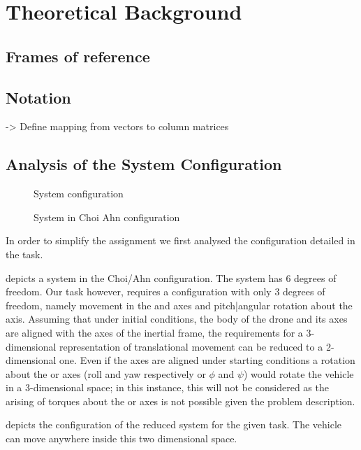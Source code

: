 \section{Theoretical Background}



\subsection{Frames of reference}

\subsection{Notation} %
-> Define mapping from vectors to column matrices

\subsection{Analysis of the System Configuration}\label{s:analysis}
\begin{figure*}[tb]
	\centering
	
	\caption{System configuration}
	\label{fig:sysconfig}
\end{figure*}
\begin{figure*}[tb]
	\centering
	
	\caption{System in Choi Ahn configuration}
	\label{fig:choiahnconfig}
\end{figure*}
In order to simplify the assignment we first analysed the configuration detailed in the task.

 depicts a system in the Choi/Ahn configuration. The system has 6 degrees of freedom. Our task however, requires a configuration with only 3 degrees of freedom, namely movement in the  and  axes and pitch|angular rotation about the  axis.
Assuming that under initial conditions, the body of the drone and its axes are aligned with the axes of the inertial frame, the requirements for a 3-dimensional representation of translational movement can be reduced to a 2-dimensional one. Even if the axes are aligned under starting conditions a rotation about the  or  axes (roll and yaw respectively or $\phi$ and $\psi$) would rotate the vehicle in a 3-dimensional space; in this instance, this will not be considered as the arising of torques about the  or  axes is not possible given the problem description.

 depicts the configuration of the reduced system for the given task. The vehicle can move anywhere inside this two dimensional space.

